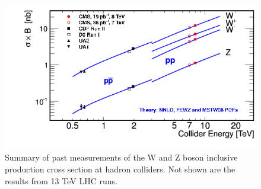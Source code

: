 \begin{figure}
\centering
\includegraphics[width=0.6\linewidth]{plots/Intro/summary.png}
\caption{Summary of past measurements of the W and Z boson inclusive production cross section at hadron colliders. Not shown are the results from 13 TeV LHC runs.}
\label{fig:intro:summary:meas}
\end{figure}